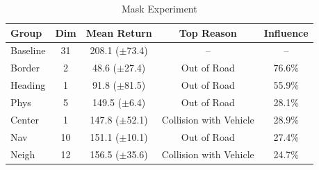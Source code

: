\begin{table}[htbp]
\centering
\caption{Mask Experiment}
\label{tab:mask experiment}
\begin{tabular}{@{}lcccc@{}}
\toprule
\textbf{Group} & \textbf{Dim} & \textbf{Mean Return} & \textbf{Top Reason} & \textbf{Influence} \\
\midrule
Baseline & 31 & 208.1 ($\pm$73.4) & -- & -- \\
Border & 2 & 48.6 ($\pm$27.4) & Out of Road & 76.6\% \\
Heading & 1 & 91.8 ($\pm$81.5) & Out of Road & 55.9\% \\
Phys & 5 & 149.5 ($\pm$6.4) & Out of Road & 28.1\% \\
Center & 1 & 147.8 ($\pm$52.1) & Collision with Vehicle & 28.9\% \\
Nav & 10 & 151.1 ($\pm$10.1) & Out of Road & 27.4\% \\
Neigh & 12 & 156.5 ($\pm$35.6) & Collision with Vehicle & 24.7\% \\
\bottomrule
\end{tabular}
\end{table}
\fi


